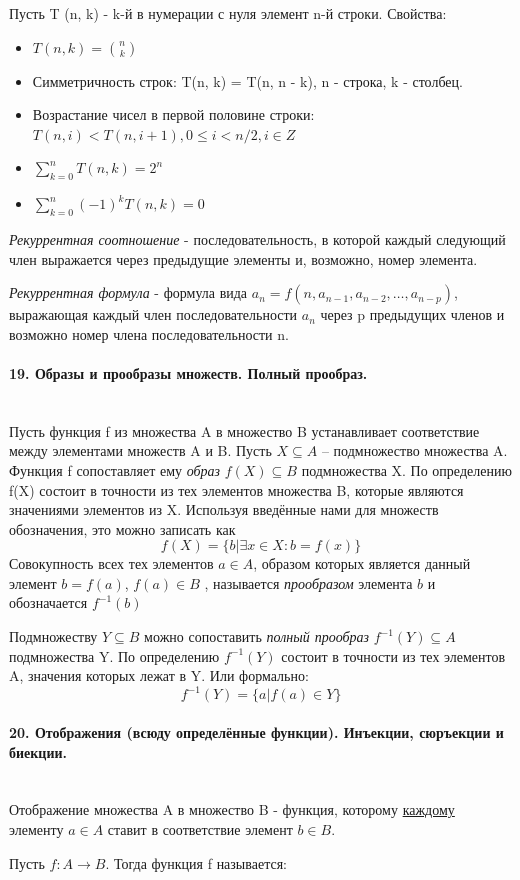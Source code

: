 \documentclass[a4paper, 12pt]{article}
\newcommand{\parag}[1]{\paragraph{#1}\mbox{}\\}
\begin{document}
Пусть T (n, k) - k-й в нумерации с нуля элемент n-й строки. Свойства:
\begin{itemize}
    \item $T(n, k) = {n \choose k}$
    \item Симметричность строк: T(n, k) = T(n, n - k), n - строка, k - столбец.
    \item Возрастание чисел в первой половине строки: $T(n, i) < T (n, i + 1), 0 \leqslant i < n/2, i \in Z$
    \item $\sum_{k=0}^{n} T(n, k) = 2^n$
    \item $\sum_{k=0}^{n} (-1)^k T(n, k) = 0$
\end{itemize}

\noindent
\textit{Рекуррентная соотношение} - последовательность, в которой каждый следующий член выражается через предыдущие элементы и, возможно, номер элемента.

\noindent
\textit{Рекуррентная формула} - формула вида $a_{n}=f(n,a_{n-1},a_{n-2},\dots ,a_{n-p})$, выражающая каждый член последовательности $a_{n}$ через p предыдущих членов и возможно номер члена последовательности n.

\parag{19. Образы и прообразы множеств. Полный прообраз.}
Пусть функция f из множества A в множество B устанавливает соответствие между элементами множеств A и B. Пусть $X \subseteq A$ – подмножество множества A. Функция f сопоставляет ему \textit{образ} $f(X) \subseteq B$ подмножества X. По определению f(X) состоит в точности из тех
элементов множества B, которые являются значениями элементов из X. Используя введённые нами для множеств обозначения, это можно записать как
\[
    f(X) = \{ b | \exists x \in X: b = f(x) \}
\]
Совокупность всех тех элементов $a \in A$, образом которых является данный элемент $b = f(a)$, $f(a) \in B$ , называется \textit{прообразом} элемента $b$ и обозначается $f^{-1}(b)$

\noindent
Подмножеству $Y \subseteq B$ можно сопоставить \textit{полный прообраз} $f^{-1}(Y) \subseteq A $ подмножества Y. По определению $f^{-1}(Y)$ состоит в точности из тех элементов A, значения которых лежат в Y. Или формально:
\[
    f^{-1}(Y) = \{a | f(a) \in Y\}
\]

\parag{20. Отображения (всюду определённые функции). Инъекции, сюръекции и биекции.}
Отображение множества A в множество B - функция, которому \underline{каждому} элементу $a \in A$ ставит в соответствие элемент $b \in B$.

\noindent
Пусть $f: A \to B$. Тогда функция f называется:
\end{document}

